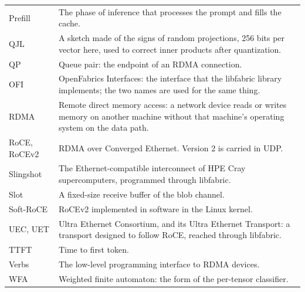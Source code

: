\begin{tightblock}
\begin{longtable}{L{3.3cm}L{11.2cm}}
  Prefill & The phase of inference that processes the prompt and fills the cache. \\
  QJL & A sketch made of the signs of random projections, 256 bits per vector here, used to correct inner products after quantization. \\
  QP & Queue pair: the endpoint of an RDMA connection. \\
  OFI & OpenFabrics Interfaces: the interface that the libfabric library implements; the two names are used for the same thing. \\
  RDMA & Remote direct memory access: a network device reads or writes memory on another machine without that machine's operating system on the data path. \\
  RoCE, RoCEv2 & RDMA over Converged Ethernet. Version 2 is carried in UDP. \\  Slingshot & The Ethernet-compatible interconnect of HPE Cray supercomputers, programmed through libfabric. \\
  Slot & A fixed-size receive buffer of the blob channel. \\
  Soft-RoCE & RoCEv2 implemented in software in the Linux kernel. \\
  UEC, UET & Ultra Ethernet Consortium, and its Ultra Ethernet Transport: a transport designed to follow RoCE, reached through libfabric. \\
  TTFT & Time to first token. \\
  Verbs & The low-level programming interface to RDMA devices. \\
  WFA & Weighted finite automaton: the form of the per-tensor classifier. \\
  \bottomrule
\end{longtable}
\end{tightblock}
